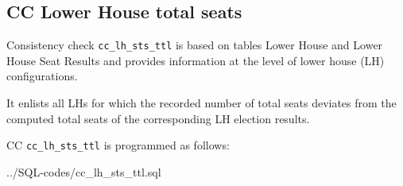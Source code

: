 \subsection{CC Lower House total seats}\label{cc_lh_sts_ttl}
Consistency check \texttt{\footnotesize cc\_lh\_sts\_ttl} is based on tables Lower House and Lower House Seat Results and provides information at the level of lower house (LH) configurations.

It enlists all LHs for which the recorded number of total seats deviates from the computed total seats of the corresponding LH election results.

CC \texttt{\footnotesize cc\_lh\_sts\_ttl} is programmed as follows:

%
{../SQL-codes/cc_lh_sts_ttl.sql}

